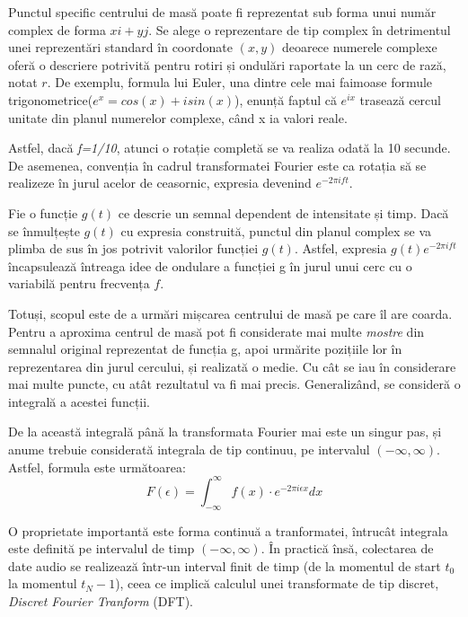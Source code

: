 \documentclass[a4paper,12pt]{report}
\begin{document}
Punctul specific centrului de masă poate fi reprezentat sub forma unui număr complex de forma $xi + yj$.
Se alege o reprezentare de tip complex în detrimentul unei reprezentări standard în coordonate $(x,y)$
deoarece numerele complexe oferă o descriere potrivită pentru rotiri și ondulări raportate la un cerc de rază, notat $r$.
De exemplu, formula lui Euler, una dintre cele mai faimoase formule trigonometrice($e^x = cos(x) + isin(x)$),
enunță faptul că $e^{ix}$ trasează cercul unitate din planul numerelor complexe, când x ia valori reale.

Astfel, dacă \emph{f=1/10}, atunci
o rotație completă se va realiza odată la 10 secunde.
De asemenea, convenția în cadrul transformatei Fourier este ca rotația să se realizeze în jurul
acelor de ceasornic, expresia devenind $e^{-2{\pi}ift}$.

Fie o funcție $g(t)$ ce descrie un semnal dependent de intensitate și timp. Dacă se înmulțește
$g(t)$ cu expresia construită, punctul din planul complex se va plimba de sus în jos potrivit
valorilor funcției $g(t)$. Astfel, expresia $g(t) e^{-2{\pi}ift}$ încapsulează întreaga idee de 
ondulare a funcției g în jurul unui cerc cu o variabilă pentru frecvența $f$.  

Totuși, scopul este de a urmări mișcarea centrului de masă pe care îl are coarda. Pentru 
a aproxima centrul de masă pot fi considerate mai multe \emph{mostre} din semnalul original reprezentat 
de funcția g, apoi urmărite pozițiile lor în reprezentarea din jurul cercului, și realizată o medie.
Cu cât se iau în considerare mai multe puncte, cu atât rezultatul va fi mai precis. Generalizând, se consideră
o integrală a acestei funcții.

De la această integrală până la transformata Fourier mai este un singur pas, și anume trebuie considerată
integrala de tip continuu, pe intervalul $(-\infty, \infty)$. Astfel, formula este următoarea:
\begin{equation*}
    F(\epsilon) = \int_{-\infty}^{\infty} f(x) \cdot e ^ {-2 {\pi}i {\epsilon} x} dx
\end{equation*}

O proprietate importantă este forma continuă a tranformatei, 
întrucât integrala este definită pe intervalul de timp $(-\infty, \infty)$. În practică însă, 
colectarea de date audio se realizează într-un interval 
finit de timp (de la momentul de start $t_0$ la momentul $t_N-1$), ceea ce 
implică calculul unei transformate de tip discret, \emph{Discret Fourier Tranform} (DFT). 
\end{document}
